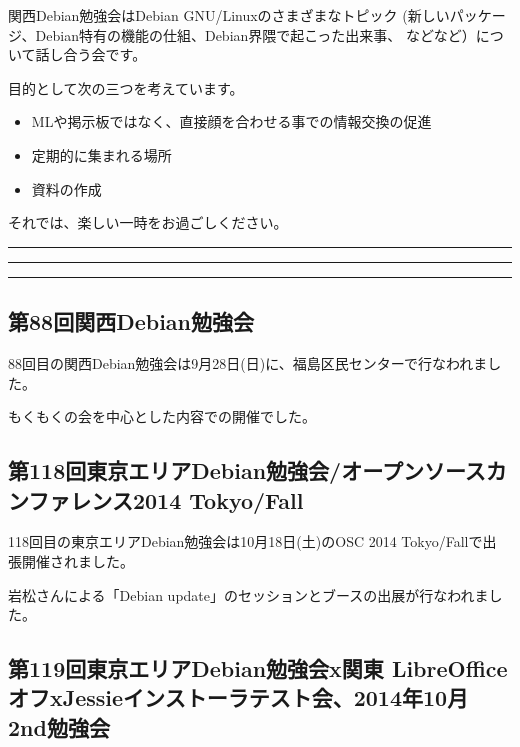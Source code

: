 \documentclass[mingoth,a4paper]{jsarticle}
\begin{document}
 関西Debian勉強会はDebian GNU/Linuxのさまざまなトピック
 (新しいパッケージ、Debian特有の機能の仕組、Debian界隈で起こった出来事、
 などなど）について話し合う会です。

 目的として次の三つを考えています。
 \begin{itemize}
  \item MLや掲示板ではなく、直接顔を合わせる事での情報交換の促進
  \item 定期的に集まれる場所
  \item 資料の作成
 \end{itemize}

 それでは、楽しい一時をお過ごしください。

\newpage

\begin{minipage}[b]{0.2\hsize}
 {}
\end{minipage}
\begin{minipage}[b]{0.8\hsize}
\hrule
\vspace{2mm}
\hrule
\setcounter{tocdepth}{1}
\tableofcontents
\vspace{2mm}
\hrule
\end{minipage}


\subsection{第88回関西Debian勉強会}

88回目の関西Debian勉強会は9月28日(日)に、福島区民センターで行なわれました。

もくもくの会を中心とした内容での開催でした。

\subsection{第118回東京エリアDebian勉強会/オープンソースカンファレンス2014 Tokyo/Fall}

118回目の東京エリアDebian勉強会は10月18日(土)のOSC 2014 Tokyo/Fallで出
張開催されました。

岩松さんによる「Debian update」のセッションとブースの出展が行なわれまし
た。

\subsection{第119回東京エリアDebian勉強会x関東 LibreOffice オフxJessieインストーラテスト会、2014年10月 2nd勉強会}
\end{document}
